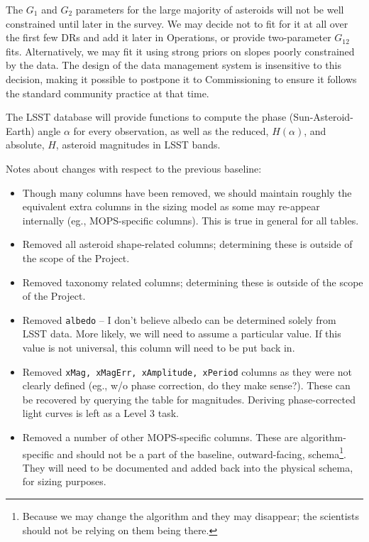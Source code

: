 \documentclass[SE,lsstdraft,toc]{lsstdoc}
\newcommand{\marginreq}[1]{\marginpar{\hspace{0pt}\tiny #1}}
\newcommand{\dmreq}[1]{\marginreq{DMS-REQ-#1}}
\begin{document}
The $G_1$ and $G_2$ parameters for the large majority of asteroids will not be well constrained until later in the survey. We may decide not to fit for it at all over the first few DRs and add it later in Operations, or provide two-parameter $G_{12}$ fits. Alternatively, we may fit it using strong priors on slopes poorly constrained by the data. The design of the data management system is insensitive to this decision, making it possible to postpone it to Commissioning to ensure it follows the standard community practice at that time.

The LSST database will provide functions to compute the phase (Sun-Asteroid-Earth) angle $\alpha$ for every observation, as well as the reduced, $H(\alpha)$, and absolute, $H$, asteroid magnitudes in LSST bands.\dmreq{0323}

\begin{changelog}
Notes about changes with respect to the previous baseline:
\begin{itemize}
\item Though many columns have been removed, we should maintain roughly the equivalent extra columns in the sizing model as some may re-appear internally (eg., MOPS-specific columns). This is true in general for all tables.
\item Removed all asteroid shape-related columns; determining these is outside of the scope of the Project.
\item Removed taxonomy related columns; determining these is outside of the scope of the Project.
\item Removed \texttt{albedo} -- I don't believe albedo can be determined solely from LSST data. More likely, we will need to assume a particular value. If this value is not universal, this column will need to be put back in.
\item Removed \texttt{xMag, xMagErr, xAmplitude, xPeriod} columns as they were not clearly defined (eg., w/o phase correction, do they make sense?). These can be recovered by querying the \DIASource table for magnitudes. Deriving phase-corrected light curves is left as a Level 3 task.
\item Removed a number of other MOPS-specific columns. These are algorithm-specific and should not be a part of the baseline, outward-facing, schema\footnote{Because we may change the algorithm and they may disappear; the scientists should not be relying on them being there.}. They will need to be documented and added back into the physical schema, for sizing purposes.
\end{itemize}
\end{changelog}
\end{document}
